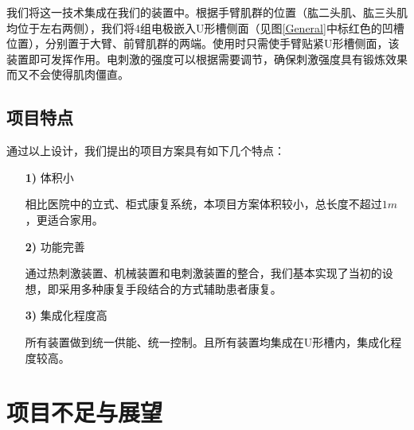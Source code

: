 \documentclass[UTF8]{ctexart}
\begin{document}
            我们将这一技术集成在我们的装置中。根据手臂肌群的位置（肱二头肌、肱三头肌均位于左右两侧），我们将4组电极嵌入U形槽侧面（见图\ref{General}中标红色的凹槽位置），分别置于大臂、前臂肌群的两端。使用时只需使手臂贴紧U形槽侧面，该装置即可发挥作用。电刺激的强度可以根据需要调节，确保刺激强度具有锻炼效果而又不会使得肌肉僵直。
    \subsection{项目特点}
        通过以上设计，我们提出的项目方案具有如下几个特点：
        \begin{enumerate}
            \item[\textbf{1)}]体积小
             
                相比医院中的立式、柜式康复系统，本项目方案体积较小，总长度不超过$1m$，更适合家用。
            \item[\textbf{2)}] 功能完善
            
                通过热刺激装置、机械装置和电刺激装置的整合，我们基本实现了当初的设想，即采用多种康复手段结合的方式辅助患者康复。 
            \item[\textbf{3)}]集成化程度高
                
                所有装置做到统一供能、统一控制。且所有装置均集成在U形槽内，集成化程度较高。
        \end{enumerate}
\newpage

\section{项目不足与展望}
\end{document}
